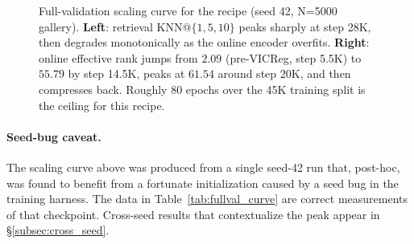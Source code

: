 \begin{table}[t]
\centering
\caption{Full-validation audit (N=5000, random KNN@1 baseline $0.02\%$).
Pre-VICReg  baseline contrasted with six 
checkpoints from a single seed-42 run.  Row marked $\star$ is the peak.}
\label{tab:fullval_curve}
\smallskip
{}
\end{table}

\begin{figure}[t]
\centering

\caption{Full-validation scaling curve for the  recipe (seed 42, N=5000 gallery).  \textbf{Left}: retrieval
KNN@$\{1,5,10\}$ peaks sharply at step 28K, then degrades monotonically as
the online encoder overfits.  \textbf{Right}: online effective rank jumps
from $2.09$ (pre-VICReg, step 5.5K) to $55.79$ by step 14.5K, peaks at
$61.54$ around step 20K, and then compresses back.  Roughly 80 epochs
over the 45K training split is the ceiling for this recipe.}
\label{fig:scaling_curve}
\end{figure}

\paragraph{Seed-bug caveat.}
The scaling curve above was produced from a single seed-42 run that,
post-hoc, was found to benefit from a fortunate initialization caused by
a seed bug in the training harness.  The data in
Table~\ref{tab:fullval_curve} are correct measurements of that
checkpoint.  Cross-seed results that contextualize the peak appear in
\S\ref{subsec:cross_seed}.

